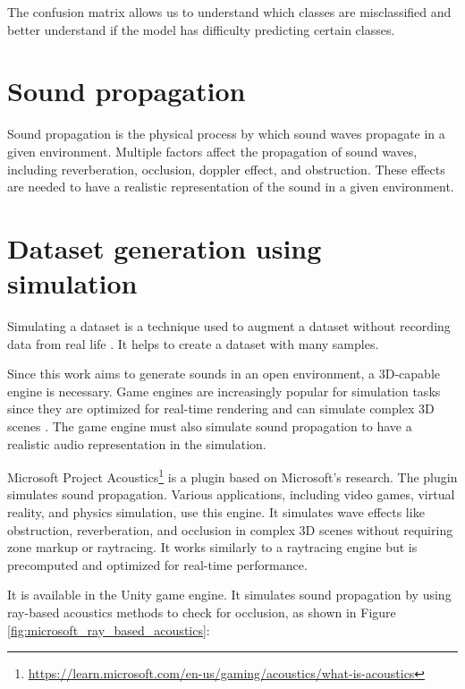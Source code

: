 The confusion matrix allows us to understand which classes are misclassified and better understand if the model has difficulty predicting certain classes.

\section{Sound propagation}
Sound propagation is the physical process by which sound waves propagate in a given environment. Multiple factors affect the propagation of sound waves, including reverberation, occlusion, doppler effect, and obstruction. These effects are needed to have a realistic representation of the sound in a given environment.

\section{Dataset generation using simulation}
\label{sec:dataset_generation_simulation}

Simulating a dataset is a technique used to augment a dataset without recording data from real life \cite{ghilardi2019automatic}. It helps to create a dataset with many samples. 

Since this work aims to generate sounds in an open environment, a 3D-capable engine is necessary. Game engines are increasingly popular for simulation tasks since they are optimized for real-time rendering and can simulate complex 3D scenes \cite{carla}. The game engine must also simulate sound propagation to have a realistic audio representation in the simulation. 


Microsoft Project Acoustics\footnote{\url{https://learn.microsoft.com/en-us/gaming/acoustics/what-is-acoustics}} is a plugin based on Microsoft's research\cite{rosen2020interactive}. The plugin simulates sound propagation. Various applications, including video games, virtual reality, and physics simulation, use this engine. It simulates wave effects like obstruction, reverberation, and occlusion in complex 3D scenes without requiring zone markup or raytracing. It works similarly to a raytracing engine but is precomputed and optimized for real-time performance. 

 It is available in the Unity game engine. It simulates sound propagation by using ray-based acoustics methods to check for occlusion, as shown in Figure \ref{fig:microsoft_ray_based_acoustics}:

